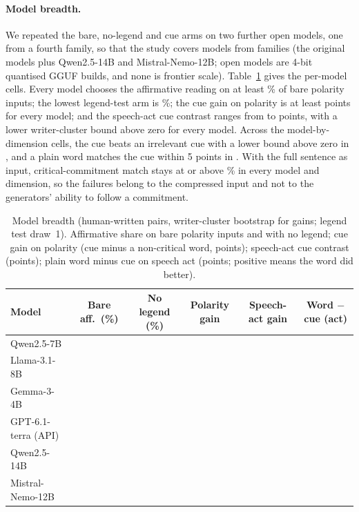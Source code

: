 \paragraph{Model breadth.}
We repeated the bare, no-legend and cue arms on two further open models, one from a fourth family, so that the study covers \jmbreadthModels{} models from \jmbreadthFamilies{} families (the \jmbreadthOrigModels{} original models plus Qwen2.5-14B and Mistral-Nemo-12B; open models are 4-bit quantised GGUF builds, and none is frontier scale). Table~\ref{tab:breadth} gives the per-model cells. Every model chooses the affirmative reading on at least \jmbreadthMinAff{}\% of bare polarity inputs; the lowest legend-test arm is \jmbmMinLegendArm{}\%; the cue gain on polarity is at least \jmbreadthPolChipMin{} points for every model; and the speech-act cue contrast ranges from \jmbreadthSpeechChipMin{} to \jmbreadthSpeechChipMax{} points, with a lower writer-cluster bound above zero for every model. Across the \jmbmCells{} model-by-dimension cells, the cue beats an irrelevant cue with a lower bound above zero in \jmbmIrrelCells{}, and a plain word matches the cue within 5 points in \jmbmWordEqCells{}. With the full sentence as input, critical-commitment match stays at or above \jmbmFullMin{}\% in every model and dimension, so the failures belong to the compressed input and not to the generators' ability to follow a commitment.

\begin{table}[t]
\caption{Model breadth (human-written pairs, writer-cluster bootstrap for gains; legend test draw~1). Affirmative share on bare polarity inputs and with no legend; cue gain on polarity (cue minus a non-critical word, points); speech-act cue contrast (points); plain word minus cue on speech act (points; positive means the word did better).}\label{tab:breadth}
\small
\begin{tabular}{lccccc}
\toprule
Model & Bare aff.\ (\%) & No legend (\%) & Polarity gain & Speech-act gain & Word $-$ cue (act) \\
\midrule
Qwen2.5-7B & \jmbmQwenSBare{} & \jmbmQwenSNoLeg{} & \jmbmQwenSPolGain{} & \jmbmQwenSActGain{} & \jmbmQwenSActWord{} \\
Llama-3.1-8B & \jmbmLlamaBare{} & \jmbmLlamaNoLeg{} & \jmbmLlamaPolGain{} & \jmbmLlamaActGain{} & \jmbmLlamaActWord{} \\
Gemma-3-4B & \jmbmGemmaBare{} & \jmbmGemmaNoLeg{} & \jmbmGemmaPolGain{} & \jmbmGemmaActGain{} & \jmbmGemmaActWord{} \\
GPT-6.1-terra (API) & \jmbmTerraBare{} & \jmbmTerraNoLeg{} & \jmbmTerraPolGain{} & \jmbmTerraActGain{} & \jmbmTerraActWord{} \\
Qwen2.5-14B & \jmbmQwenLBare{} & \jmbmQwenLNoLeg{} & \jmbmQwenLPolGain{} & \jmbmQwenLActGain{} & \jmbmQwenLActWord{} \\
Mistral-Nemo-12B & \jmbmNemoBare{} & \jmbmNemoNoLeg{} & \jmbmNemoPolGain{} & \jmbmNemoActGain{} & \jmbmNemoActWord{} \\
\bottomrule
\end{tabular}
\end{table}

